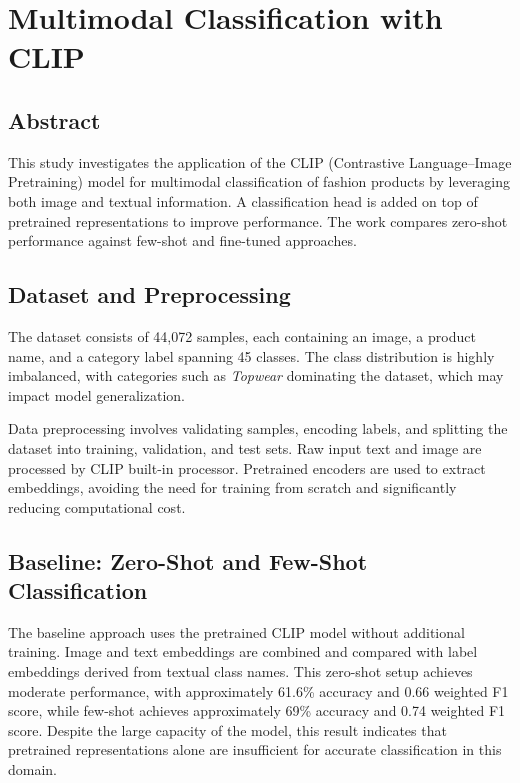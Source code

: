 \section{Multimodal Classification with CLIP}

\subsection{Abstract}
This study investigates the application of the CLIP (Contrastive Language–Image Pretraining) model for multimodal classification of fashion products by leveraging both image and textual information. A classification head is added on top of pretrained representations to improve performance. The work compares zero-shot performance against few-shot and fine-tuned approaches.

\subsection{Dataset and Preprocessing}
The dataset consists of 44,072 samples, each containing an image, a product name, and a category label spanning 45 classes. The class distribution is highly imbalanced, with categories such as \textit{Topwear} dominating the dataset, which may impact model generalization.

Data preprocessing involves validating samples, encoding labels, and splitting the dataset into training, validation, and test sets. Raw input text and image are processed by CLIP built-in processor. Pretrained encoders are used to extract embeddings, avoiding the need for training from scratch and significantly reducing computational cost.

\subsection{Baseline: Zero-Shot and Few-Shot Classification}
The baseline approach uses the pretrained CLIP model without additional training. Image and text embeddings are combined and compared with label embeddings derived from textual class names. This zero-shot setup achieves moderate performance, with approximately 61.6\% accuracy and 0.66 weighted F1 score, while few-shot achieves approximately 69\% accuracy and 0.74 weighted F1 score. Despite the large capacity of the model, this result indicates that pretrained representations alone are insufficient for accurate classification in this domain.

